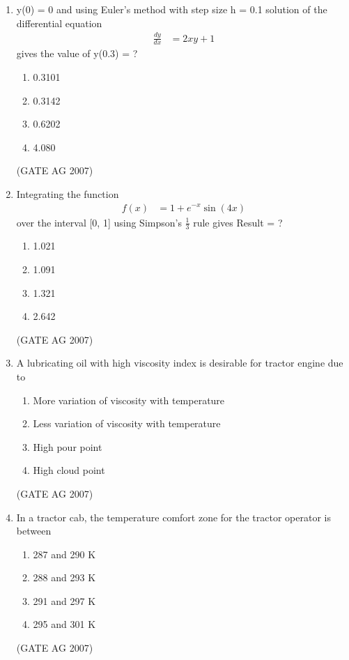 \documentclass[journal,12pt,onecolumn]{IEEEtran}
\theoremstyle{remark}
\begin{document}
\begin{enumerate}
\item 

y(0) = 0 and using Euler's method with step size h = 0.1 solution of the differential equation
\begin{align*}
\frac{dy}{dx} &= 2xy + 1
\end{align*}
gives the value of
y(0.3)  =  ?
\begin{multicols}{4}
\begin{enumerate}
    \item 0.3101
    \item 0.3142
    \item 0.6202
    \item 4.080
\end{enumerate}
\end{multicols}
\hfill(GATE AG 2007)


\item Integrating the function
\begin{align*}
f(x) &= 1 + e^{-x} \sin(4x)
\end{align*}
over the interval [0, 1] using Simpson's $\frac{1}{3}$ rule gives Result =  ?
\begin{multicols}{4}
\begin{enumerate}
    \item 1.021
    \item 1.091
    \item 1.321
    \item 2.642
\end{enumerate}
\end{multicols}
\hfill(GATE AG 2007)


\item  A lubricating oil with high viscosity index is desirable for tractor engine due to

\begin{enumerate}
    \item More variation of viscosity with temperature
    \item Less variation of viscosity with temperature
    \item High pour point
    \item High cloud point
\end{enumerate}
\hfill(GATE AG 2007)

\item  In a tractor cab, the temperature comfort zone for the tractor operator is between
\begin{multicols}{4}
\begin{enumerate}
    \item 287 and 290 K
    \item 288 and 293 K
    \item 291 and 297 K
    \item 295 and 301 K
\end{enumerate}
\end{multicols}
\hfill(GATE AG 2007)


\end{enumerate}
\end{document}
